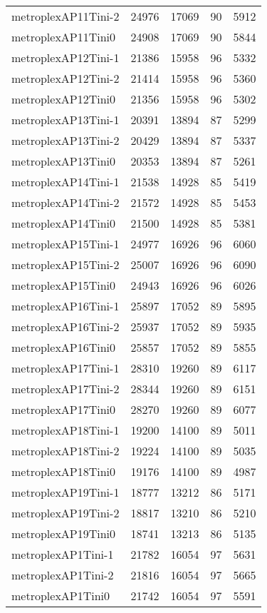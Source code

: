 \begin{tabular}{lrrrr}
metroplexAP11Tini-2 & 24976 & 17069 & 90 & 5912 \\
metroplexAP11Tini0 & 24908 & 17069 & 90 & 5844 \\
metroplexAP12Tini-1 & 21386 & 15958 & 96 & 5332 \\
metroplexAP12Tini-2 & 21414 & 15958 & 96 & 5360 \\
metroplexAP12Tini0 & 21356 & 15958 & 96 & 5302 \\
metroplexAP13Tini-1 & 20391 & 13894 & 87 & 5299 \\
metroplexAP13Tini-2 & 20429 & 13894 & 87 & 5337 \\
metroplexAP13Tini0 & 20353 & 13894 & 87 & 5261 \\
metroplexAP14Tini-1 & 21538 & 14928 & 85 & 5419 \\
metroplexAP14Tini-2 & 21572 & 14928 & 85 & 5453 \\
metroplexAP14Tini0 & 21500 & 14928 & 85 & 5381 \\
metroplexAP15Tini-1 & 24977 & 16926 & 96 & 6060 \\
metroplexAP15Tini-2 & 25007 & 16926 & 96 & 6090 \\
metroplexAP15Tini0 & 24943 & 16926 & 96 & 6026 \\
metroplexAP16Tini-1 & 25897 & 17052 & 89 & 5895 \\
metroplexAP16Tini-2 & 25937 & 17052 & 89 & 5935 \\
metroplexAP16Tini0 & 25857 & 17052 & 89 & 5855 \\
metroplexAP17Tini-1 & 28310 & 19260 & 89 & 6117 \\
metroplexAP17Tini-2 & 28344 & 19260 & 89 & 6151 \\
metroplexAP17Tini0 & 28270 & 19260 & 89 & 6077 \\
metroplexAP18Tini-1 & 19200 & 14100 & 89 & 5011 \\
metroplexAP18Tini-2 & 19224 & 14100 & 89 & 5035 \\
metroplexAP18Tini0 & 19176 & 14100 & 89 & 4987 \\
metroplexAP19Tini-1 & 18777 & 13212 & 86 & 5171 \\
metroplexAP19Tini-2 & 18817 & 13210 & 86 & 5210 \\
metroplexAP19Tini0 & 18741 & 13213 & 86 & 5135 \\
metroplexAP1Tini-1 & 21782 & 16054 & 97 & 5631 \\
metroplexAP1Tini-2 & 21816 & 16054 & 97 & 5665 \\
metroplexAP1Tini0 & 21742 & 16054 & 97 & 5591 \\

\end{tabular}

